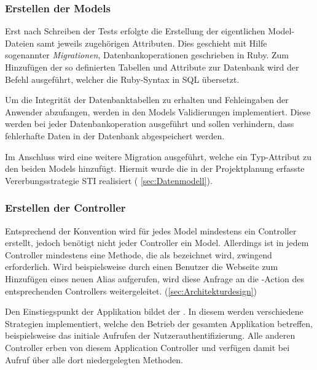 \subsubsection{Erstellen der Models}
\label{sec:Erstellen der Models}
Erst nach Schreiben der Tests erfolgte die Erstellung der eigentlichen Model-Dateien samt jeweils
zugehörigen Attributen. Dies geschieht mit Hilfe sogenannter \textit{Migrationen},
Datenbankoperationen geschrieben in Ruby. Zum Hinzufügen der so definierten Tabellen und Attribute
zur Datenbank wird der Befehl  ausgeführt, welcher die Ruby-Syntax in
\acs{SQL} übersetzt.

Um die Integrität der Datenbanktabellen zu erhalten und \ggfs Fehleingaben der Anwender abzufangen,
werden in den Models Validierungen implementiert. Diese werden bei jeder Datenbankoperation
ausgeführt und sollen verhindern, dass fehlerhafte Daten in der Datenbank abgespeichert werden.


Im Anschluss wird eine weitere Migration ausgeführt, welche ein Typ-Attribut zu den
beiden Models hinzufügt. Hiermit wurde die in der
Projektplanung erfasste Vererbungsstrategie \acs{STI} realisiert (\Vgl
\ref{sec:Datenmodell}).

\subsubsection{Erstellen der Controller}
\label{sec:Erstellen der Controller}
Entsprechend der Konvention wird für jedes Model mindestens ein
Controller erstellt, jedoch benötigt nicht jeder Controller ein Model.
Allerdings ist in jedem Controller mindestens eine Methode, die als
 bezeichnet wird, zwingend erforderlich. Wird beispielsweise
durch einen Benutzer die Webseite zum Hinzufügen eines neuen Alias
aufgerufen, wird diese Anfrage an die -Action des
entsprechenden Controllers weitergeleitet.
(\Vgl \ref{sec:Architekturdesign})


Den Einstiegspunkt der Applikation bildet der . In diesem werden
verschiedene Strategien implementiert, welche den Betrieb der gesamten Applikation betreffen,
beispielsweise das initiale Aufrufen der Nutzerauthentifizierung. Alle anderen Controller erben von diesem
Application Controller und verfügen damit bei Aufruf über alle dort niedergelegten Methoden.

